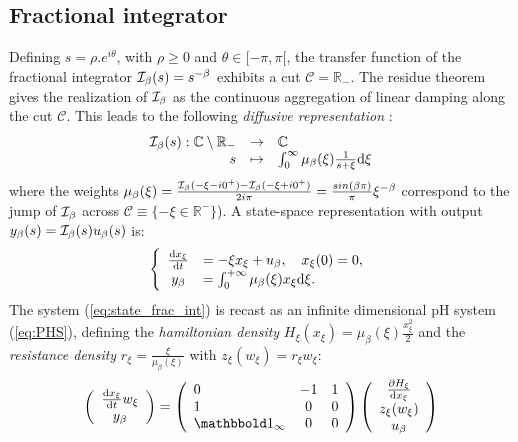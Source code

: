 \documentclass[10pt,a4paper]{article}
\begin{document}
\subsection{Fractional integrator}
%
Defining $s \!=\! \rho.e^{i\theta}$, with $\rho\geq 0$ and $\theta \in [-\pi,\pi[$, the transfer function of the fractional integrator ${\mathcal{I}}_\beta(s) = s^{-\beta}$ exhibits a cut $\mathcal{C} =\mathbb{R}_{-}$.
The residue theorem gives the realization of ${\mathcal{I}}_\beta$ as the continuous aggregation of linear damping along the cut $\mathcal{C}$. 
%
This leads to the following \emph{diffusive representation} \cite[]{le2012diffusive}:
%
\begin{equation}
\begin{array}{rcl}
{\mathcal{I}}_\beta(s): \mathbb{C}\setminus\mathbb{R}_{-}&\rightarrow&\mathbb{C}\\
s &\mapsto& \int_0^\infty \mu_\beta(\xi)\frac{1}{s+\xi}\mathrm{d}\xi
\end{array}
\end{equation}
where the weights $\mu_\beta(\xi) = \frac{{\mathcal{I}}_\beta(-\xi-i0^{+})-{\mathcal{I}}_\beta(-\xi+i0^{+})}{2i\pi}=\frac{sin(\beta \pi)}{\pi }\xi^{-\beta}$ correspond to the jump of ${\mathcal{I}}_\beta$ across $\mathcal{C}\equiv\{-\xi\in\mathbb{R}^{-}\}$).										%
%
A state-space representation with output $y_\beta(s) = {\mathcal{I}}_\beta(s) u_\beta(s)$ is:
\begin{equation}
\label{eq:state_frac_int}
\left\{ \begin{array}{cl}
\frac{\mathrm{d} x_\xi}{ \mathrm{d} t} &=  -\xi x_\xi  + u_\beta,\quad x_\xi(0)=0,\\
y_\beta&= \int_0^{+\infty} \mu_\beta(\xi)x_\xi \mathrm{d} \xi .
\end{array} \right.
\end{equation}
The system (\ref{eq:state_frac_int}) is recast as an infinite dimensional pH system (\ref{eq:PHS}), defining the \emph{hamiltonian density }$H_\xi(x_\xi) = \mu_\beta(\xi)  \frac{x_\xi^2}{2} $ and the \emph{resistance density }$r_\xi = \frac{\xi}{\mu_\beta(\xi)}$ with $z_\xi( w_\xi)=r_\xi w_\xi$:
\begin{equation}
\label{eq:phs_frac_int}
\left(\begin{array}{c}
\D{x_\xi}{t}
w_\xi \\
y_\beta
\end{array}\right)
=
\left(\begin{array}{lcc}
0&-1&1\\
1&0&0\\
\ones_\infty&0&0
\end{array}\right)
\left(\begin{array}{c}
\frac{\partial H_\xi}{\d x_\xi}\\
z_\xi( w_\xi) \\
u_\beta
\end{array}\right)
\end{equation}
\end{document}
